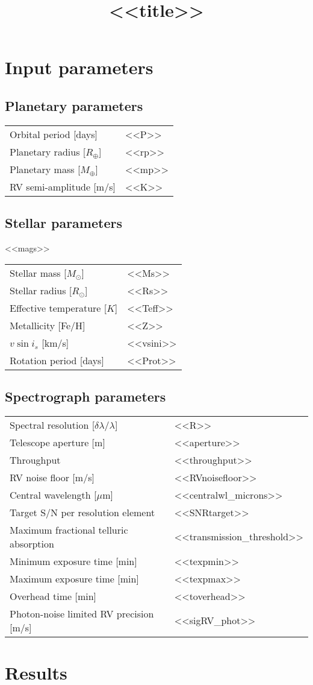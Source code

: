 \documentclass[a4paper]{article}
\title{\textbf{<<title>>}}
\begin{document}
\maketitle

\section{Input parameters}
\subsection{Planetary parameters}
\begin{tabular}{ll}
  Orbital period [days] & <<P>> \\
  Planetary radius [$R_{\oplus}$] & <<rp>> \\
  Planetary mass [$M_{\oplus}$] & <<mp>> \\
  RV semi-amplitude [m/s] & <<K>>
\end{tabular}

\subsection{Stellar parameters}
<<mags>> \\

\noindent
\begin{tabular}{ll}
  Stellar mass [$M_{\odot}$] & <<Ms>> \\  
  Stellar radius [$R_{\odot}$] & <<Rs>> \\
  Effective temperature [$K$] & <<Teff>> \\
  Metallicity [Fe/H] & <<Z>> \\
  $v\sin{i_s}$ [km/s] & <<vsini>> \\
  Rotation period [days] & <<Prot>>
\end{tabular}

\subsection{Spectrograph parameters}
\begin{tabular}{ll}
  Spectral resolution [$\delta \lambda / \lambda$] & <<R>> \\
  Telescope aperture [m] & <<aperture>> \\
  Throughput & <<throughput>> \\
  RV noise floor [m/s] & <<RVnoisefloor>> \\
  Central wavelength [$\mu$m] & <<centralwl_microns>> \\ 
  Target S/N per resolution element & <<SNRtarget>> \\
  Maximum fractional telluric absorption & <<transmission_threshold>> \\
  Minimum exposure time [min] & <<texpmin>> \\
  Maximum exposure time [min] & <<texpmax>> \\
  Overhead time [min] & <<toverhead>> \\
  Photon-noise limited RV precision [m/s] & <<sigRV_phot>>
\end{tabular}

\section{Results}
\end{document}
